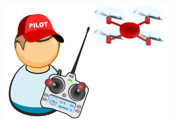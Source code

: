\documentclass{article}
\def\frameseparation{1.5cm}
\def\scalingfactor{.8}
\begin{document}

\begin{center}
\includegraphics[width=90mm]{drone.pdf}
\end{center}
\end{document}
